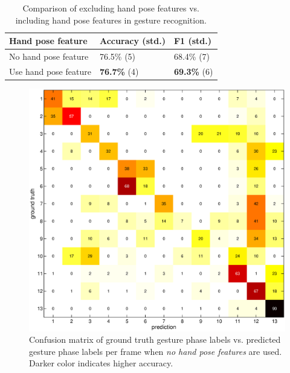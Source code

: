 \documentclass{sigchi}
\newcommand\tabhead[1]{\small\textbf{#1}}
\begin{document}
\begin{table}
\centering
\begin{tabular}{|l|l|l|}
\hline
\tabhead{Hand pose feature} & \tabhead{Accuracy (std.)} & \tabhead{F1 (std.)}\\
\hline
No hand pose feature & 76.5\% (5) & 68.4\% (7)\\
\hline
Use hand pose feature  & \textbf{76.7\%} (4) & \textbf{69.3\%} (6) \\
\hline
\end{tabular}
\caption{Comparison of excluding hand pose features vs. including hand pose features in gesture recognition.}
\label{tab:hand-pose-feature}
\end{table}

\begin{figure}
\centering
\hspace{-8.5755mm}\includegraphics[width=1.05\columnwidth]{figure/cm9.eps}
\caption{Confusion matrix of ground truth gesture phase labels vs. predicted
gesture phase labels per frame when \textit{no hand pose features} are used. Darker
color indicates higher accuracy.}
\label{fig:cm9}
\end{figure}
\end{document}
